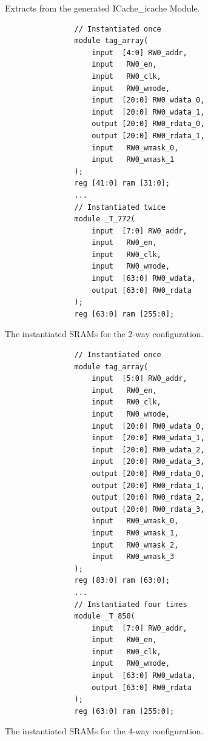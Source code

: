 \documentclass[journal,a4paper]{IEEEtran}
\begin{document}
\begin{table}
	\caption{Extracts from the generated ICache\_icache Module.}
	\label{srams}
	\begin{subtable}[b]{0.9\linewidth}
		\begin{verbatim}
				// Instantiated once
				module tag_array(
					input  [4:0] RW0_addr,
					input   RW0_en,
					input   RW0_clk,
					input   RW0_wmode,
					input  [20:0] RW0_wdata_0,
					input  [20:0] RW0_wdata_1,
					output [20:0] RW0_rdata_0,
					output [20:0] RW0_rdata_1,
					input   RW0_wmask_0,
					input   RW0_wmask_1
				);
				reg [41:0] ram [31:0];
				...
				// Instantiated twice
				module _T_772(
					input  [7:0] RW0_addr,
					input   RW0_en,
					input   RW0_clk,
					input   RW0_wmode,
					input  [63:0] RW0_wdata,
					output [63:0] RW0_rdata
				);
				reg [63:0] ram [255:0];
		\end{verbatim}
		\caption{The instantiated SRAMs for the 2-way configuration.}
		\label{srams-2-way}
	\end{subtable}
	\begin{subtable}[b]{0.9\linewidth}
		\begin{verbatim}
				// Instantiated once
				module tag_array(
					input  [5:0] RW0_addr,
					input   RW0_en,
					input   RW0_clk,
					input   RW0_wmode,
					input  [20:0] RW0_wdata_0,
					input  [20:0] RW0_wdata_1,
					input  [20:0] RW0_wdata_2,
					input  [20:0] RW0_wdata_3,
					output [20:0] RW0_rdata_0,
					output [20:0] RW0_rdata_1,
					output [20:0] RW0_rdata_2,
					output [20:0] RW0_rdata_3,
					input   RW0_wmask_0,
					input   RW0_wmask_1,
					input   RW0_wmask_2,
					input   RW0_wmask_3
				);
				reg [83:0] ram [63:0];
				...
				// Instantiated four times
				module _T_850(
					input  [7:0] RW0_addr,
					input   RW0_en,
					input   RW0_clk,
					input   RW0_wmode,
					input  [63:0] RW0_wdata,
					output [63:0] RW0_rdata
				);
				reg [63:0] ram [255:0];
		\end{verbatim}
		\caption{The instantiated SRAMs for the 4-way configuration.}
		\label{srams-4-way}
	\end{subtable}
\end{table}
\end{document}
